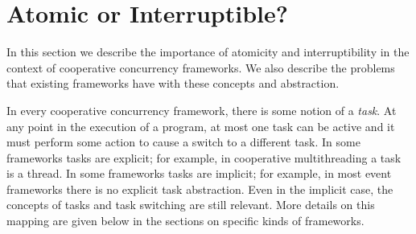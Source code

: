 \documentclass[9pt,preprint]{sigplanconf}
\begin{document}




\section{Atomic or Interruptible?}

In this section we describe the importance of atomicity and interruptibility in the context of cooperative concurrency frameworks.
We also describe the problems that existing frameworks have with these concepts and abstraction.

In every cooperative concurrency framework, there is some notion of a \emph{task}.
At any point in the execution of a program, at most one task can be active and it must perform some action to cause a switch to a different task.
In some frameworks tasks are explicit; for example, in cooperative multithreading a task is a thread.
In some frameworks tasks are implicit; for example, in most event frameworks there is no explicit task abstraction.
Even in the implicit case, the concepts of tasks and task switching are still relevant.
More details on this mapping are given below in the sections on specific kinds of frameworks.
\end{document}
